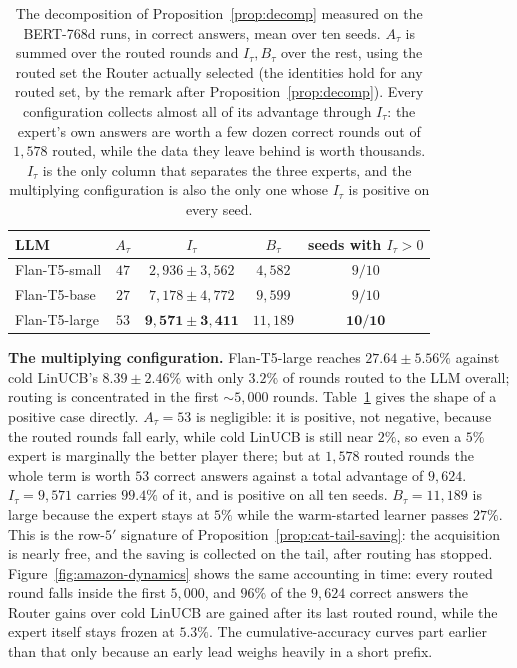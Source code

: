 \documentclass{article}
\theoremstyle{definition}
\theoremstyle{remark}
\theoremstyle{remark}
\begin{document}
\begin{table}[h]
\centering
\caption{The decomposition of Proposition~\ref{prop:decomp} measured on the
BERT-768d runs, in correct answers, mean over ten seeds. $A_\tau$ is summed
over the routed rounds and $I_\tau,B_\tau$ over the rest, using the routed set
the Router actually selected (the identities hold for any routed set, by the
remark after Proposition~\ref{prop:decomp}). Every configuration collects
almost all of its advantage through $I_\tau$: the expert's own answers are
worth a few dozen correct rounds out of $1{,}578$ routed, while the data they
leave behind is worth thousands. $I_\tau$ is the only column that separates
the three experts, and the multiplying configuration is also the only one whose
$I_\tau$ is positive on every seed.}
\label{tab:amazon-decomp}
\small
\begin{tabular}{@{}lcccc@{}}
\toprule
LLM & $A_\tau$ & $I_\tau$ & $B_\tau$ & seeds with $I_\tau>0$ \\
\midrule
Flan-T5-small  & $47$ & $2{,}936\pm3{,}562$ & $4{,}582$ & $9/10$ \\
Flan-T5-base   & $27$ & $7{,}178\pm4{,}772$ & $9{,}599$ & $9/10$ \\
Flan-T5-large  & $53$ & $\mathbf{9{,}571\pm3{,}411}$ & $11{,}189$ & $\mathbf{10/10}$ \\
\bottomrule
\end{tabular}
\end{table}

\textbf{The multiplying configuration.} Flan-T5-large reaches
$27.64\pm5.56\%$ against cold LinUCB's $8.39\pm2.46\%$ with only $3.2\%$ of
rounds routed to the LLM overall; routing is concentrated in the first
$\sim5{,}000$ rounds. Table~\ref{tab:amazon-decomp} gives the shape of a
positive case directly. $A_{\tau}=53$ is negligible: it is positive, not
negative, because the routed rounds fall early, while cold LinUCB is still
near $2\%$, so even a $5\%$ expert is marginally the better player there; but
at $1{,}578$ routed rounds the whole term is worth $53$ correct answers
against a total advantage of $9{,}624$. $I_{\tau}=9{,}571$ carries $99.4\%$ of
it, and is positive on all ten seeds. $B_{\tau}=11{,}189$ is large because the
expert stays at $5\%$ while the warm-started learner passes $27\%$. This is
the row-$5'$ signature of Proposition~\ref{prop:cat-tail-saving}: the
acquisition is nearly free, and the saving is collected on the tail, after
routing has stopped. Figure~\ref{fig:amazon-dynamics} shows the same
accounting in time: every routed round falls inside the first $5{,}000$, and
$96\%$ of the $9{,}624$ correct answers the Router gains over cold LinUCB are
gained after its last routed round, while the expert itself stays frozen at
$5.3\%$. The cumulative-accuracy curves part earlier than that only because an
early lead weighs heavily in a short prefix.
\end{document}
